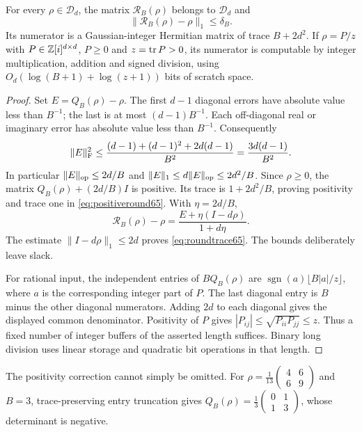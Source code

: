 \begin{lemma}\label{lem:positiveround65}
For every $\rho\in\mathcal D_d$, the matrix $\mathcal R_B(\rho)$
belongs to $\mathcal D_d$ and
\begin{equation}\label{eq:roundtrace65}
                 \|\mathcal R_B(\rho)-\rho\|_1\le\delta_B.
\end{equation}
Its numerator is a Gaussian-integer Hermitian matrix of trace
$B+2d^2$. If $\rho=P/z$ with $P\in\mathbb Z[i]^{d\times d}$, $P\ge0$ and
$z=\operatorname{tr} P>0$, its numerator is computable by integer multiplication,
addition and signed division, using $O_d(\log(B+1)+\log(z+1))$
bits of scratch space.
\end{lemma}
\begin{proof}
Set $E=Q_B(\rho)-\rho$. The first $d-1$ diagonal errors have
absolute value less than $B^{-1}$; the last is at most
$(d-1)B^{-1}$. Each off-diagonal real or imaginary error has
absolute value less than $B^{-1}$. Consequently
\[
 \|E\|_{\rm F}^2\le
 \frac{(d-1)+(d-1)^2+2d(d-1)}{B^2}
 =\frac{3d(d-1)}{B^2}.
\]
In particular $\|E\|_{\rm op}\le2d/B$ and
$\|E\|_1\le d\|E\|_{\rm op}\le2d^2/B$.
Since $\rho\ge0$, the matrix $Q_B(\rho)+(2d/B)I$ is positive.
Its trace is $1+2d^2/B$, proving positivity and trace one in
\eqref{eq:positiveround65}. With $\eta=2d/B$,
\[
 \mathcal R_B(\rho)-\rho
       =\frac{E+\eta(I-d\rho)}{1+d\eta}.
\]
The estimate $\|I-d\rho\|_1\le2d$ proves
\eqref{eq:roundtrace65}. The bounds deliberately leave slack.

For rational input, the independent entries of $BQ_B(\rho)$ are
$\operatorname{sgn}(a)\lfloor B|a|/z\rfloor$, where $a$ is the
corresponding integer part of $P$. The last diagonal entry is
$B$ minus the other diagonal numerators. Adding $2d$ to each diagonal
gives the displayed common denominator. Positivity of $P$ gives
$|P_{ij}|\le\sqrt{P_{ii}P_{jj}}\le z$. Thus a fixed number of
integer buffers of the asserted length suffices. Binary long division
uses linear storage and quadratic bit operations in that length.
\end{proof}

The positivity correction cannot simply be omitted. For
$\rho=\frac1{13}\left(\begin{smallmatrix}4&6\\6&9\end{smallmatrix}\right)$
and $B=3$, trace-preserving entry truncation gives
$Q_B(\rho)=\frac13\left(\begin{smallmatrix}0&1\\1&3\end{smallmatrix}\right)$,
whose determinant is negative.

